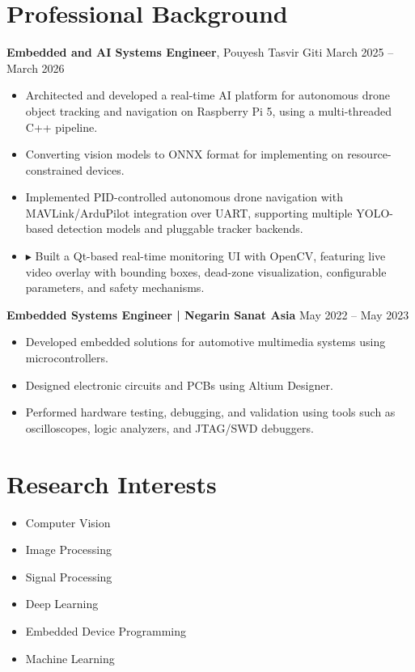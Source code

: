 \documentclass[10pt,a4paper]{article}
\begin{document}
		\section{Professional Background}
	
	\textbf{Embedded and AI Systems Engineer}, Pouyesh Tasvir Giti \hfill  March 2025 -- March 2026
	\begin{itemize}
		\item Architected and developed a real-time AI platform for autonomous drone object tracking and navigation on Raspberry Pi 5, using a multi-threaded C++ pipeline.
		\item Converting vision models to ONNX format for implementing on resource-constrained devices.
		\item Implemented PID-controlled autonomous drone navigation with MAVLink/ArduPilot integration over UART, supporting multiple YOLO-based detection models and pluggable tracker backends.
		\item ▸ Built a Qt-based real-time monitoring UI with OpenCV, featuring live video overlay with bounding boxes, dead-zone visualization, configurable parameters, and safety mechanisms.
	\end{itemize}
	
	\vspace{8pt}
	
	\textbf{Embedded Systems Engineer | Negarin Sanat Asia} \hfill May 2022 -- May 2023
	\begin{itemize}
		\item Developed embedded solutions for automotive multimedia systems using microcontrollers.
		\item Designed electronic circuits and PCBs using Altium Designer.
		\item Performed hardware testing, debugging, and validation using tools such as oscilloscopes, logic analyzers, and JTAG/SWD debuggers.
	\end{itemize}
	
	\section{Research Interests}
	
	\begin{minipage}[t]{0.5\textwidth}
		\begin{itemize}
			\item Computer Vision
			\item Image Processing
			\item Signal Processing
		\end{itemize}
	\end{minipage}%
	\begin{minipage}[t]{0.5\textwidth}
		\begin{itemize}
			\item Deep Learning
			\item Embedded Device Programming
			\item Machine Learning
		\end{itemize}
	\end{minipage}
	
\end{document}
